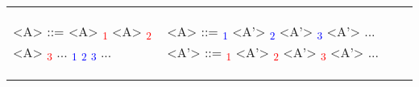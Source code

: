 \begin{center}
	\begin{tabular}{p{5cm} p{5cm}}
		
		\begin{grammarEx}
			<A> ::= <A> \textcolor{red}{\textalpha \textsubscript{1}}
			\alt <A> \textcolor{red}{\textalpha \textsubscript{2}}
			\alt <A> \textcolor{red}{\textalpha \textsubscript{3}}
			...
			\alt \textcolor{blue}{\textbeta \textsubscript{1}}
			\alt \textcolor{blue}{\textbeta \textsubscript{2}}
			\alt \textcolor{blue}{\textbeta \textsubscript{3}}
			...
		\end{grammarEx}
		
		&
		
		\begin{grammarEx}
			<A> ::= \textcolor{blue}{\textbeta \textsubscript{1}} <A'>
			\alt \textcolor{blue}{\textbeta \textsubscript{2}} <A'>
			\alt \textcolor{blue}{\textbeta \textsubscript{3}} <A'>
			...
			<A'> ::= \textcolor{red}{\textalpha \textsubscript{1}} <A'>
			\alt \textcolor{red}{\textalpha \textsubscript{2}} <A'>
			\alt \textcolor{red}{\textalpha \textsubscript{3}} <A'>
			...
			\alt \textepsilon
		\end{grammarEx}
		
	\end{tabular}
\end{center}